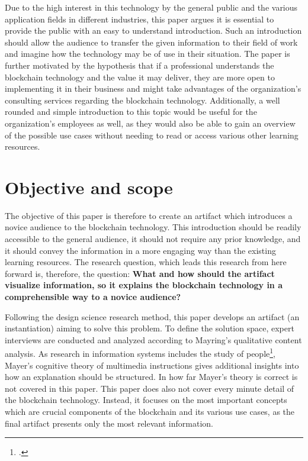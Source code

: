 Due to the high interest in this technology by the general public and the various application fields in different industries, this paper argues it is essential to provide the public with an easy to understand introduction. Such an introduction should allow the audience to transfer the given information to their field of work and imagine how the technology may be of use in their situation. The paper is further motivated by the hypothesis that if a professional understands the blockchain technology and the value it may deliver, they are more open to implementing it in their business and might take advantages of the organization's consulting services regarding the blockchain technology. Additionally, a well rounded and simple introduction to this topic would be useful for the organization's employees as well, as they would also be able to gain an overview of the possible use cases without needing to read or access various other learning resources.

\section{Objective and scope} \label{sec:Objective}

The objective of this paper is therefore to create an artifact which introduces a novice audience to the blockchain technology. This introduction should be readily accessible to the general audience, it should not require any prior knowledge, and it should convey the information in a more engaging way than the existing learning resources. The research question, which leads this research from here forward is, therefore, the question: \textbf{What and how should the artifact visualize information, so it explains the blockchain technology in a comprehensible way to a novice audience?}

Following the design science research method, this paper develops an artifact (an instantiation) aiming to solve this problem. To define the solution space, expert interviews are conducted and analyzed according to Mayring's qualitative content analysis. As research in information systems includes the study of people\footcite[Cf.][p.11]{OsterleGestaltungsorientierteWirtschaftsinformatikPladoyer2010}, Mayer's cognitive theory of multimedia instructions gives additional insights into how an explanation should be structured. In how far Mayer's theory is correct is not covered in this paper. This paper does also not cover every minute detail of the blockchain technology. Instead, it focuses on the most important concepts which are crucial components of the blockchain and its various use cases, as the final artifact presents only the most relevant information. 
    

